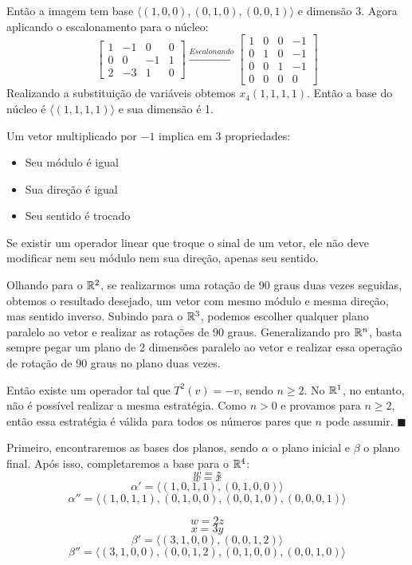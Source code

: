 \documentclass{homework}
\begin{document}
Então a imagem tem base $\langle(1,0,0),(0,1,0),(0,0,1)\rangle$ e dimensão 3. Agora aplicando o escalonamento para o núcleo:
\[\begin{bmatrix}
1 & -1 & 0 & 0\\
0 & 0 & -1 & 1\\
2 & -3 & 1 & 0
\end{bmatrix} \xrightarrow{Escalonando}
\begin{bmatrix}
1 & 0 & 0 & -1\\
0 & 1 & 0 & -1\\
0 & 0 & 1 & -1\\
0 & 0 & 0 & 0
\end{bmatrix}\]
Realizando a substituição de variáveis obtemos $x_4(1,1,1,1)$. Então a base do núcleo é $\langle(1,1,1,1)\rangle$ e sua dimensão é 1.

\exercise*
Um vetor multiplicado por $-1$ implica em 3 propriedades:
\begin{itemize}
    \item Seu módulo é igual
    \item Sua direção é igual
    \item Seu sentido é trocado
\end{itemize}
Se existir um operador linear que troque o sinal de um vetor, ele não deve modificar nem seu módulo nem sua direção, apenas seu sentido. 

Olhando para o $\mathbb R^2$, se realizarmos uma rotação de 90 graus duas vezes seguidas, obtemos o resultado desejado, um vetor com mesmo módulo e mesma direção, mas sentido inverso. Subindo para o $\mathbb R^3$, podemos escolher qualquer plano paralelo ao vetor e realizar as rotações de 90 graus. Generalizando pro $\mathbb R^n$, basta sempre pegar um plano de 2 dimensões paralelo ao vetor e realizar essa operação de rotação de 90 graus no plano duas vezes.

Então existe um operador tal que $T^2(v) = -v$, sendo $n\geq2$. No $\mathbb R^1$, no entanto, não é possível realizar a mesma estratégia. Como $n>0$ e provamos para $n\geq2$, então essa estratégia é válida para todos os números pares que $n$ pode assumir. $\blacksquare$

\exercise*
Primeiro, encontraremos as bases dos planos, sendo $\alpha$ o plano inicial e $\beta$ o plano final. Após isso, completaremos a base para o $\mathbb R^4$:
\[w = z\]
\[w = x\]
\[\alpha' = \langle(1,0,1,1),(0,1,0,0)\rangle\]
\[\alpha'' = \langle(1,0,1,1),(0,1,0,0),(0,0,1,0),(0,0,0,1)\rangle\]

\[w = 2z\]
\[x = 3y\]
\[\beta' = \langle(3,1,0,0),(0,0,1,2)\rangle\]
\[\beta'' = \langle(3,1,0,0),(0,0,1,2),(0,1,0,0),(0,0,1,0)\rangle\]
\end{document}
